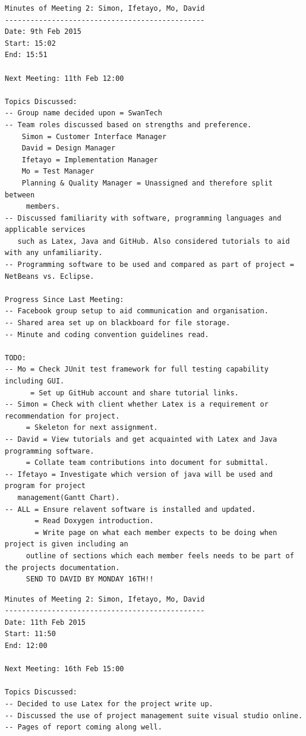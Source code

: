 \documentclass[a4paper,10pt]{article}
\begin{document}
\begin{appendices}
\begin{lstlisting}[frame=single,caption=Meeting of 9/2/15,label=minutes1]
Minutes of Meeting 2: Simon, Ifetayo, Mo, David
-----------------------------------------------
Date: 9th Feb 2015
Start: 15:02
End: 15:51

Next Meeting: 11th Feb 12:00

Topics Discussed:
-- Group name decided upon = SwanTech
-- Team roles discussed based on strengths and preference. 
	Simon = Customer Interface Manager
	David = Design Manager
	Ifetayo = Implementation Manager
	Mo = Test Manager
	Planning & Quality Manager = Unassigned and therefore split between
	 members.
-- Discussed familiarity with software, programming languages and applicable services
   such as Latex, Java and GitHub. Also considered tutorials to aid with any unfamiliarity. 
-- Programming software to be used and compared as part of project =  NetBeans vs. Eclipse.

Progress Since Last Meeting:
-- Facebook group setup to aid communication and organisation.
-- Shared area set up on blackboard for file storage.
-- Minute and coding convention guidelines read.

TODO:
-- Mo = Check JUnit test framework for full testing capability including GUI.
      = Set up GitHub account and share tutorial links.
-- Simon = Check with client whether Latex is a requirement or recommendation for project.
	 = Skeleton for next assignment.
-- David = View tutorials and get acquainted with Latex and Java programming software.
	 = Collate team contributions into document for submittal.
-- Ifetayo = Investigate which version of java will be used and program for project 
   management(Gantt Chart).
-- ALL = Ensure relavent software is installed and updated.
       = Read Doxygen introduction.
       = Write page on what each member expects to be doing when project is given including an
	 outline of sections which each member feels needs to be part of the projects documentation.
	 SEND TO DAVID BY MONDAY 16TH!!
\end{lstlisting}

\begin{lstlisting}[frame=single,caption=Meeting of 11/2/15,label=minutes2]
Minutes of Meeting 2: Simon, Ifetayo, Mo, David
-----------------------------------------------
Date: 11th Feb 2015
Start: 11:50
End: 12:00

Next Meeting: 16th Feb 15:00

Topics Discussed:
-- Decided to use Latex for the project write up.
-- Discussed the use of project management suite visual studio online.
-- Pages of report coming along well.


\end{lstlisting}
\end{appendices}
\end{document}
